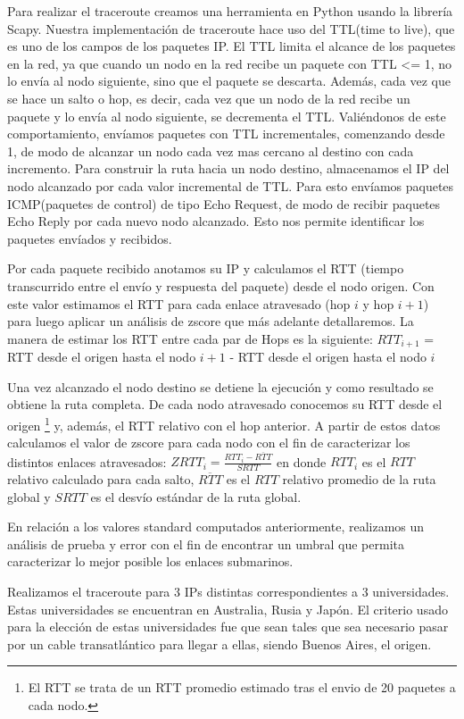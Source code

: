Para realizar el traceroute creamos una herramienta en Python usando la librería Scapy. 
Nuestra implementación de traceroute hace uso del TTL(time to live), que es uno de los campos de los paquetes IP. El TTL limita el alcance de los paquetes en la red, ya que cuando un nodo en la red recibe un paquete con TTL <= 1, no lo envía al nodo siguiente, sino que el paquete se descarta. Además, cada vez que se hace un salto o hop, es decir, cada vez que un nodo de la red recibe un paquete y lo envía al nodo siguiente, se decrementa el TTL. Valiéndonos de este comportamiento, envíamos paquetes con TTL incrementales, comenzando desde 1, de modo de alcanzar un nodo cada vez mas cercano al destino con cada incremento.
Para construir la ruta hacia un nodo destino, almacenamos el IP del nodo alcanzado por cada valor incremental de TTL. Para esto envíamos paquetes ICMP(paquetes de control) de tipo Echo Request, de modo de recibir paquetes Echo Reply por cada nuevo nodo alcanzado. Esto nos permite identificar los paquetes envíados y recibidos. 

Por cada paquete recibido anotamos su IP y calculamos el RTT (tiempo transcurrido entre el envío y respuesta del paquete) desde el nodo origen. Con este valor estimamos el RTT para cada enlace atravesado (hop $i$ y hop $i+1$) para luego aplicar un análisis de zscore que más adelante detallaremos. La manera de estimar los RTT entre cada par de Hops es la siguiente:
\newline
\newline
$RTT_{i+1}$ = RTT desde el origen hasta el nodo $i+1$ - RTT desde el origen hasta el nodo $i$
\newline

Una vez alcanzado el nodo destino se detiene la ejecución y como resultado se obtiene la ruta completa. De cada nodo atravesado conocemos su RTT desde el origen \footnote{El RTT se trata de un RTT promedio estimado tras el envio de 20 paquetes a cada nodo.} y, además, el RTT relativo con el hop anterior. A partir de estos datos calculamos el valor de zscore para cada nodo con el fin de caracterizar los distintos enlaces atravesados:
\newline
\newline
$ZRTT_i = \frac{RTT_i-\overline{RTT}}{SRTT}$
en donde $RTT_i$ es el $RTT$ relativo calculado para cada salto, $\overline{RTT}$ es el $RTT$ relativo promedio de la ruta global y $SRTT$ es el desvío estándar de la ruta global.
\newline

En relación a los valores standard computados anteriormente, realizamos un análisis de prueba y error con el fin de encontrar un umbral que permita caracterizar lo mejor posible los enlaces submarinos.

Realizamos el traceroute para 3 IPs distintas correspondientes a 3 universidades. Estas universidades se encuentran en Australia, Rusia y Japón. El criterio usado para la elección de estas universidades fue que sean tales que sea necesario pasar por un cable transatlántico para llegar a ellas, siendo Buenos Aires, el origen.